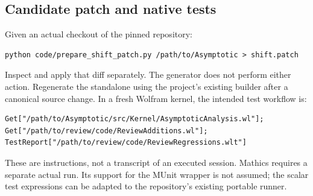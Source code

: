 \documentclass[11pt,letterpaper]{article}
\begin{document}
\subsection{Candidate patch and native tests}
Given an actual checkout of the pinned repository:
\par\noindent\begin{minipage}{\linewidth}
\begin{lstlisting}
python code/prepare_shift_patch.py /path/to/Asymptotic > shift.patch
\end{lstlisting}
\end{minipage}\par
Inspect and apply that diff separately. The generator does not perform either action. Regenerate the standalone using the project's existing builder after a canonical source change.\cite{kernel-map} In a fresh Wolfram kernel, the intended test workflow is:
\par\noindent\begin{minipage}{\linewidth}
\begin{lstlisting}
Get["/path/to/Asymptotic/src/Kernel/AsymptoticAnalysis.wl"];
Get["/path/to/review/code/ReviewAdditions.wl"];
TestReport["/path/to/review/code/ReviewRegressions.wlt"]
\end{lstlisting}
\end{minipage}\par
These are instructions, not a transcript of an executed session. Mathics requires a separate actual run. Its support for the MUnit wrapper is not assumed; the scalar test expressions can be adapted to the repository's existing portable runner.
\end{document}
